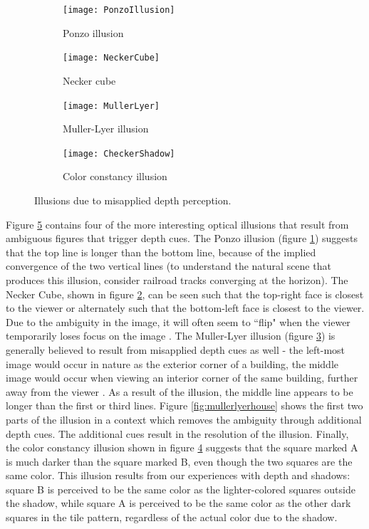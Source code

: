 \documentclass[11pt]{isuthesis}\usepackage[]{graphicx}\usepackage[]{color}
\begin{document}
\begin{figure}[htbp]\centering

\begin{subfigure}[b]{.35\linewidth}\centering
  \texttt{[image: PonzoIllusion]}
  \caption{Ponzo illusion}\label{fig:Ponzo}
\end{subfigure}\hfil
\begin{subfigure}[b]{.35\linewidth}\centering
  \texttt{[image: NeckerCube]}
  \caption{Necker cube}\label{fig:NeckerCube}
\end{subfigure}\vspace*{12pt}
\begin{subfigure}[b]{.35\linewidth}\centering
  \texttt{[image: MullerLyer]}
  \caption{Muller-Lyer illusion}\label{fig:MullerLyer}
\end{subfigure}\hfil
\begin{subfigure}[b]{.35\linewidth}\centering
  \texttt{[image: CheckerShadow]}
  \caption{Color constancy illusion}\label{fig:ColorConstancy}
\end{subfigure}
\caption[Depth illusions]{Illusions due to misapplied depth perception.}\label{fig:DepthIllusions}
\end{figure}
Figure \ref{fig:DepthIllusions} contains four of the more interesting optical illusions that result from ambiguous figures that trigger depth cues. The Ponzo illusion (figure \ref{fig:Ponzo}) suggests that the top line is longer than the bottom line, because of the implied convergence of the two vertical lines (to understand the natural scene that produces this illusion, consider railroad tracks converging at the horizon). The Necker Cube, shown in figure \ref{fig:NeckerCube}, can be seen such that the top-right face is closest to the viewer or alternately such that the bottom-left face is closest to the viewer. Due to the ambiguity in the image, it will often seem to ``flip" when the viewer temporarily loses focus on the image \citep{gregory1997knowledge}. The Muller-Lyer illusion (figure \ref{fig:MullerLyer}) is generally believed to result from misapplied depth cues as well - the left-most image would occur in nature as the exterior corner of a building, the middle image would occur when viewing an interior corner of the same building, further away from the viewer \citep{ward1977case, gregory1968perceptual, fisher1970experimental}. As a result of the illusion, the middle line appears to be longer than the first or third lines. Figure \ref{fig:mullerlyerhouse} shows the first two parts of the illusion in a context which removes the ambiguity through additional depth cues. The additional cues result in the resolution of the illusion. Finally, the color constancy illusion shown in figure \ref{fig:ColorConstancy} suggests that the square marked A is much darker than the square marked B, even though the two squares are the same color. This illusion results from our experiences with depth and shadows: square B is perceived to be the same color as the lighter-colored squares outside the shadow, while square A is perceived to be the same color as the other dark squares in the tile pattern, regardless of the actual color due to the shadow. 
\end{document}
